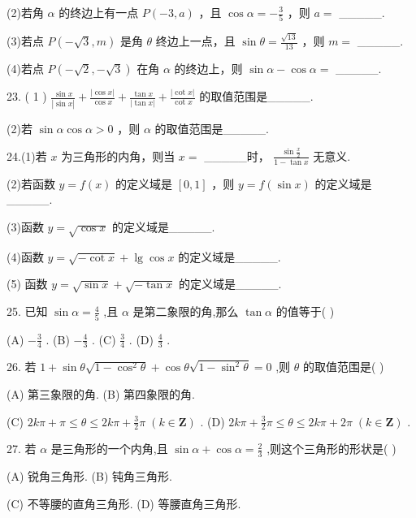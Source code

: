 \documentclass[10pt]{article}
\begin{document}
(2)若角 \(\alpha\) 的终边上有一点 \(P\left( {-3,a}\right)\) ，且 \(\cos \alpha  =  - \frac{3}{5}\) ，则 \(a =\) \_\_\_\_\_.

(3)若点 \(P\left( {-\sqrt{3},m}\right)\) 是角 \(\theta\) 终边上一点，且 \(\sin \theta  = \frac{\sqrt{13}}{13}\) ，则 \(m =\) \_\_\_\_\_.

(4)若点 \(P\left( {-\sqrt{2}, - \sqrt{3}}\right)\) 在角 \(\alpha\) 的终边上，则 \(\sin \alpha  - \cos \alpha  =\) \_\_\_\_\_.

23. ( 1 ) \(\frac{\sin x}{\left| \sin x\right| } + \frac{\left| \cos x\right| }{\cos x} + \frac{\tan x}{\left| \tan x\right| } + \frac{\left| \cot x\right| }{\cot x}\) 的取值范围是\_\_\_\_\_.

(2)若 \(\sin \alpha \cos \alpha  > 0\) ，则 \(\alpha\) 的取值范围是\_\_\_\_\_.

24.(1)若 \(x\) 为三角形的内角，则当 \(x =\) \_\_\_\_\_时， \(\frac{\sin \frac{x}{2}}{1 - \tan x}\) 无意义.

(2)若函数 \(y = f\left( x\right)\) 的定义域是 \(\left\lbrack  {0,1}\right\rbrack\) ，则 \(y = f\left( {\sin x}\right)\) 的定义域是\_\_\_\_\_.

(3)函数 \(y = \sqrt{\cos x}\) 的定义域是\_\_\_\_\_.

(4)函数 \(y = \sqrt{-\cot x} + \lg \cos x\) 的定义域是\_\_\_\_\_.

(5) 函数 \(y = \sqrt{\sin x} + \sqrt{-\tan x}\) 的定义域是\_\_\_\_\_.

25. 已知 \(\sin \alpha  = \frac{4}{5}\) ,且 \(\alpha\) 是第二象限的角,那么 \(\tan \alpha\) 的值等于(   )

(A) \(- \frac{3}{4}\) . (B) \(- \frac{4}{3}\) . (C) \(\frac{3}{4}\) . (D) \(\frac{4}{3}\) .

26. 若 \(1 + \sin \theta \sqrt{1 - {\cos }^{2}\theta } + \cos \theta \sqrt{1 - {\sin }^{2}\theta } = 0\) ,则 \(\theta\) 的取值范围是( )

(A) 第三象限的角. (B) 第四象限的角.

(C) \({2k\pi } + \pi  \leq  \theta  \leq  {2k\pi } + \frac{3}{2}\pi \;\left( {k \in  \mathbf{Z}}\right)\) . (D) \({2k\pi } + \frac{3}{2}\pi  \leq  \theta  \leq  {2k\pi } + {2\pi }\;\left( {k \in  \mathbf{Z}}\right)\) .

27. 若 \(\alpha\) 是三角形的一个内角,且 \(\sin \alpha  + \cos \alpha  = \frac{2}{3}\) ,则这个三角形的形状是( )

(A) 锐角三角形. (B) 钝角三角形.

(C) 不等腰的直角三角形. (D) 等腰直角三角形.
\end{document}
